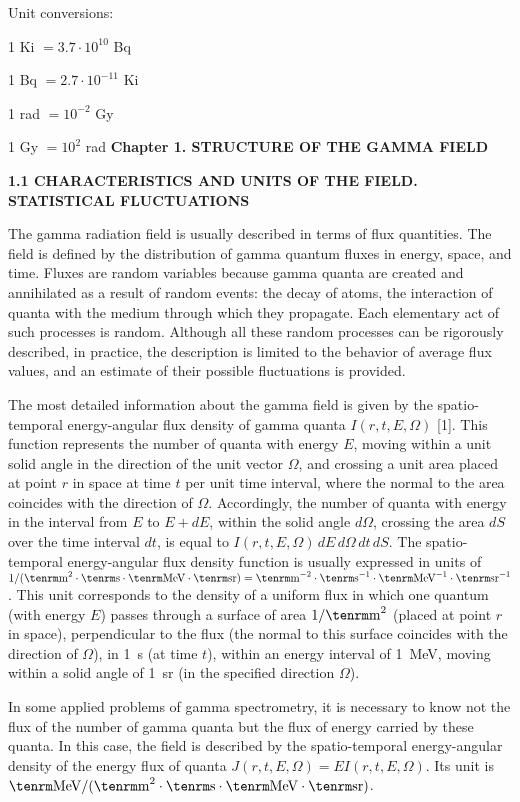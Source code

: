 %
%
 Unit conversions:

1 Ki $=3.7\cdot10^{10}$ Bq

1 Bq $=2.7\cdot10^{-11}$ Ki

1 rad $=10^{-2}$ Gy

1 Gy $=10^2$ rad
\vfill
\eject
%
{\bf Chapter 1. STRUCTURE OF THE GAMMA FIELD}

{\bf 1.1 CHARACTERISTICS AND UNITS OF THE FIELD. STATISTICAL FLUCTUATIONS}

The gamma radiation field is usually described in terms of flux quantities.
The field is defined by the distribution of gamma quantum fluxes in energy, space, and time.
Fluxes are random variables because gamma quanta are created and annihilated as a result of random events: the decay of atoms, the interaction of quanta with the medium through which they propagate.
Each elementary act of such processes is random.
Although all these random processes can be rigorously described, in practice, the description is limited to the behavior of average flux values, and an estimate of their possible fluctuations is provided.

The most detailed information about the gamma field is given by the spatio-temporal energy-angular flux density of gamma quanta 
$I(r,t,E,\Omega)$ [1].
This function represents the number of quanta with energy $E$, moving within a unit solid angle in the direction of the unit vector $\Omega$, and crossing a unit area placed at point $r$ in space at time $t$ per unit time interval, where the normal to the area coincides with the direction of $\Omega$.
Accordingly, the number of quanta with energy in the interval from $E$ to $E+dE$, within the solid angle $d\Omega$, crossing the area $dS$ over the time interval $dt$, is equal to $I(r,t,E,\Omega)\,dE\,d\Omega\,dt\,dS$.
The spatio-temporal energy-angular flux density function is usually expressed in units of $1/({\rm m}^2\cdot{\rm s}\cdot{\rm MeV}\cdot{\rm sr})={\rm m}^{-2}\cdot{\rm s}^{-1}\cdot{\rm MeV}^{-1}\cdot{\rm sr}^{-1}$.
This unit corresponds to the density of a uniform flux in which one quantum (with energy $E$) passes through a surface of area $1/{\rm m}^2$ (placed at point $r$ in space), perpendicular to the flux (the normal to this surface coincides with the direction of $\Omega$), in 1~s (at time $t$), within an energy interval of 1~MeV, moving within a solid angle of 1~sr (in the specified direction $\Omega$).

In some applied problems of gamma spectrometry, it is necessary to know not the flux of the number of gamma quanta but the flux of energy carried by these quanta.
In this case, the field is described by the spatio-temporal energy-angular density of the energy flux of quanta $J(r,t,E,\Omega)=EI(r,t,E,\Omega)$.
Its unit is ${\rm MeV}/({\rm m}^2\cdot{\rm s}\cdot{\rm MeV}\cdot{\rm sr})$.

